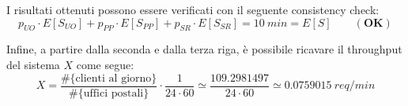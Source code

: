 I risultati ottenuti possono essere verificati con il seguente consistency check:
\begin{equation}
p_{UO}\cdot E[S_{UO}] + p_{PP}\cdot E[S_{PP}] + p_{SR}\cdot E[S_{SR}] = 10\ min = E[S]\qquad (\mathbf{OK})
\end{equation}

Infine, a partire dalla seconda e dalla terza riga, è possibile ricavare il throughput del sistema $X$ come segue:
\begin{equation}
X = \frac{\# \lbrace \text{clienti al giorno} \rbrace}{\# \lbrace \text{uffici postali} \rbrace} \cdot \frac{1}{24 \cdot 60} \simeq \frac{109.2981497}{24 \cdot 60} \simeq 0.0759015\ req/min
\end{equation} 
















